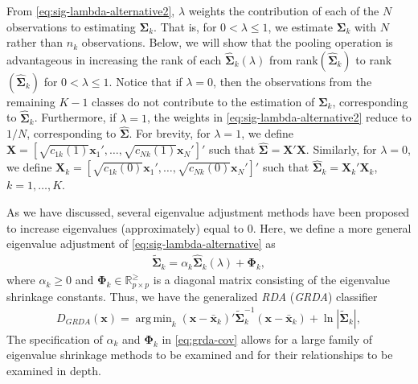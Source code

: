 \documentclass[11pt]{article}
\newcommand{\xbar}{\bar{\bm x}}
\DeclareMathOperator*{\argmin}{arg\,min}
\begin{document}
From \eqref{eq:sig-lambda-alternative2}, $\lambda$ weights the contribution of each of the $N$ observations to estimating $\bm \Sigma_k$. That is, for $0 < \lambda \le 1$, we estimate $\bm \Sigma_k$ with $N$ rather than $n_k$ observations. Below, we will show that the pooling operation is advantageous in increasing the rank of each $\widehat{\bm\Sigma}_k(\lambda)$ from rank$(\widehat{\bm\Sigma}_k)$ to rank$(\widehat{\bm\Sigma}_k)$ for $0 < \lambda \le 1$. Notice that if $\lambda  = 0$, then the observations from the remaining $K - 1$ classes do not contribute to the estimation of $\bm \Sigma_k$, corresponding to $\widehat{\bm \Sigma}_k$. Furthermore, if $\lambda = 1$, the weights in \eqref{eq:sig-lambda-alternative2} reduce to $1/N$, corresponding to $\widehat{\bm\Sigma}$. For brevity, for $\lambda = 1$, we define $\bm X = [\sqrt{c_{1k}(1)} \bm x_1', \ldots,  \sqrt{c_{Nk}(1)} \bm x_N']'$ such that $\widehat{\bm \Sigma} = \bm X' \bm X$. Similarly, for $\lambda = 0$, we define $\bm X_k = [\sqrt{c_{1k}(0)} \bm x_1', \ldots,  \sqrt{c_{Nk}(0)} \bm x_N']'$ such that $\widehat{\bm \Sigma}_k = \bm X_k' \bm X_k$, $k = 1, \ldots, K$.


As we have discussed, several eigenvalue adjustment methods have been proposed to increase eigenvalues (approximately) equal to 0. Here, we define a more general eigenvalue adjustment of \eqref{eq:sig-lambda-alternative} as
\begin{align}
	\tilde{\bm \Sigma}_k = \alpha_k \widehat{\bm \Sigma}_k(\lambda) + \bm \Phi_k,\label{eq:grda-cov}
\end{align}
where $\alpha_k \ge 0$ and $\bm \Phi_k \in \mathbb{R}_{p \times p}^{\ge}$ is a diagonal matrix consisting of the eigenvalue shrinkage constants. Thus, we have the generalized \emph{RDA} (\emph{GRDA}) classifier
\begin{align}
	D_{GRDA}(\bm x) = \argmin_{k}  (\bm x - \xbar_k)'\tilde{\bm\Sigma}_k^{-1}(\bm x - \xbar_k)  + \ln |\tilde{\bm\Sigma}_k|, \label{eq:grda}
\end{align}
The specification of $\alpha_k$ and $\bm \Phi_k$ in \eqref{eq:grda-cov} allows for a large family of eigenvalue shrinkage methods to be examined and for their relationships to be examined in depth.
\end{document}
